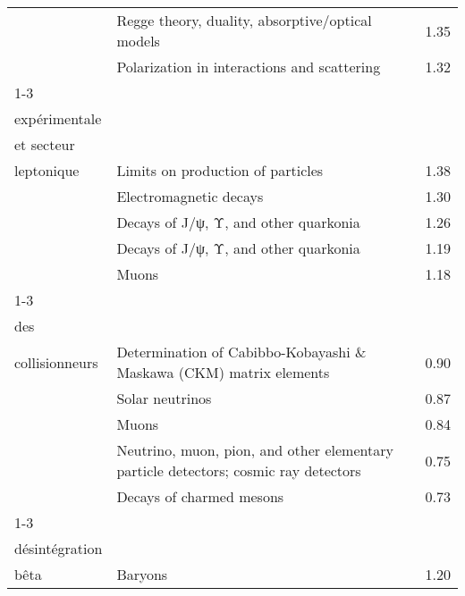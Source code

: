\begin{longtable}[H]{p{}|p{}|p{}}
                                                                               & Regge theory, duality, absorptive/optical models &  1.35 \\
                                                                               & Polarization in interactions and scattering &  1.32 \\
\cline{1-3}
\multirow{5}{*}{\begin{tabular}{l}Données\\ expérimentale\\ et secteur\\ leptonique\end{tabular}} & Limits on production of particles &  1.38 \\
                                                                               & Electromagnetic decays &  1.30 \\
                                                                               & Decays of J/ψ, Υ, and other quarkonia &  1.26 \\
                                                                               & Decays of J/ψ, Υ, and other quarkonia &  1.19 \\
                                                                               & Muons &  1.18 \\
\cline{1-3}
\multirow{5}{*}{\begin{tabular}{l}Données issues\\ des\\ collisionneurs\end{tabular}} & Determination of Cabibbo-Kobayashi \& Maskawa (CKM) matrix elements &  0.90 \\
                                                                               & Solar neutrinos &  0.87 \\
                                                                               & Muons &  0.84 \\
                                                                               & Neutrino, muon, pion, and other elementary particle detectors; cosmic ray detectors &  0.75 \\
                                                                               & Decays of charmed mesons &  0.73 \\
\cline{1-3}
\multirow{5}{*}{\begin{tabular}{l}Double\\ désintégration\\ bêta\end{tabular}} & Baryons &  1.20 \\

\end{longtable}

